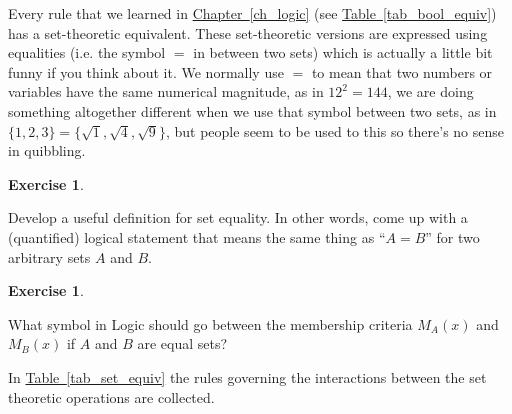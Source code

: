 \documentclass[10pt,]{book}
\theoremstyle{plain}
\theoremstyle{definition}
\theoremstyle{definition}
\newtheorem{exercise}[theorem]{Exercise}
\numberwithin{equation}{section}
\begin{document}
    Every rule that we learned in \hyperref[ch_logic]{Chapter~\ref{ch_logic}}
    (see \hyperref[tab_bool_equiv]{Table~\ref{tab_bool_equiv}}) has a set-theoretic equivalent.
    These set-theoretic versions are
    expressed using equalities (i.e. the symbol \(=\) in between two sets) which
    is actually a little bit funny if you think about it. We normally
    use \(=\) to mean that two numbers or variables have the same numerical
    magnitude, as in \(12^2 = 144\), we are doing something altogether
    different when we use that symbol between two sets, as in \(\{1,2,3\}=
    \{\sqrt{1},\sqrt{4},\sqrt{9}\}\), but people seem to be used to this
    so there's no sense in quibbling.
\begin{exercise}\label{exercise-37}

        Develop a useful definition for set equality. In other words,
        come up with a (quantified) logical statement that means the
        same thing as ``\(A = B\)'' for two arbitrary sets \(A\) and \(B\).
\end{exercise}
\begin{exercise}\label{exercise-38}

        What symbol in Logic should go between the membership criteria
        \(M_A(x)\) and \(M_B(x)\) if \(A\) and \(B\) are equal sets?
\end{exercise}
\par

    In \hyperref[tab_set_equiv]{Table~\ref{tab_set_equiv}} the rules governing the interactions
    between the set theoretic operations are collected.
\par
\end{document}
